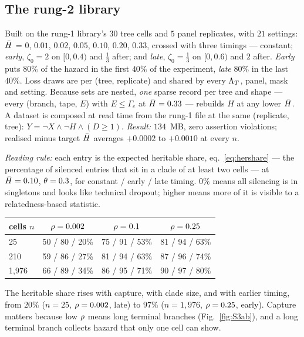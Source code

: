 \subsection{The rung-2 library}\label{sec:drop2lib}

Built on the rung-1 library's $30$ tree cells and $5$ panel replicates, with $21$ settings:
$\bar H$ = $0$, $0.01$, $0.02$, $0.05$, $0.10$, $0.20$, $0.33$, crossed with three timings --- constant;
\emph{early}, $\zeta_0=2$ on $[0,0.4)$ and $\tfrac13$ after; and \emph{late}, $\zeta_0=\tfrac13$ on
$[0,0.6)$ and $2$ after. \emph{Early} puts
$80\%$ of the hazard in the first $40\%$ of the experiment, \emph{late} $80\%$ in the last $40\%$. Loss
draws are per (tree, replicate) and shared by every $\Lambda_T$, panel, mask and setting. Because sets are
nested, \emph{one} sparse record per tree and shape --- every (branch, tape, $E$) with $E\le\Gamma_e$ at
$\bar H=0.33$ --- rebuilds $H$ at any lower $\bar H$. A dataset is composed at read time from the rung-1
file at the same (replicate, tree): $Y=\neg X\wedge\neg H\wedge(D\ge1)$. \emph{Result:} $134$~MB, zero
assertion violations; realised minus target $\bar H$ averages $+0.0002$ to $+0.0010$ at every $n$.

\begin{center}\small
\emph{Reading rule:} each entry is the expected heritable share, eq.~\eqref{eq:hershare} --- the
percentage of silenced entries that sit in a clade of at least two cells --- at $\bar H=0.10$,
$\theta=0.3$, for constant / early / late timing. $0\%$ means all silencing is in singletons and looks
like technical dropout; higher means more of it is visible to a relatedness-based statistic.\\[3pt]
\begin{tabular}{@{}lccc@{}}
\toprule
cells $n$ & $\rho=0.002$ & $\rho=0.1$ & $\rho=0.25$ \\
\midrule
25      & 50 / 80 / 20\% & 75 / 91 / 53\% & 81 / 94 / 63\% \\
210     & 59 / 86 / 27\% & 81 / 94 / 63\% & 87 / 96 / 74\% \\
1{,}976 & 66 / 89 / 34\% & 86 / 95 / 71\% & 90 / 97 / 80\% \\
\bottomrule
\end{tabular}
\end{center}
\noindent The heritable share rises with capture, with clade size, and with earlier timing, from $20\%$
($n=25$, $\rho=0.002$, late) to $97\%$ ($n=1{,}976$, $\rho=0.25$, early). Capture matters because low
$\rho$ means long terminal branches (Fig.~\ref{fig:S3ab}), and a long terminal branch collects
hazard that only one cell can show.

